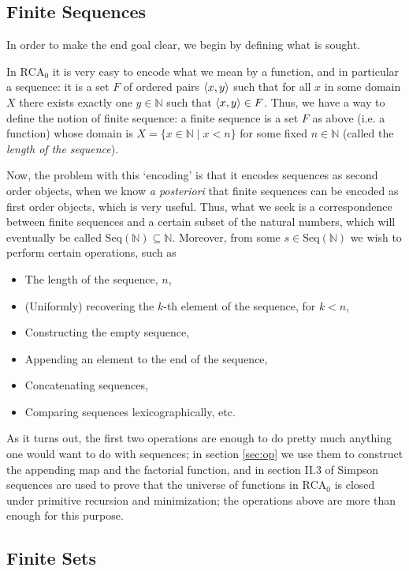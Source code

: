 \documentclass{article}
\theoremstyle{nonumberplain}
\newcommand{\N}{\mathbb{N}}
\newcommand{\RCA}{\mathrm{RCA}}
\newcommand{\Seq}{\mathrm{Seq}}
\DeclarePairedDelimiter{\braket}{\langle}{\rangle}
\begin{document}
\subsection{Finite Sequences}\label{subsec:fs}

In order to make the end goal clear, we begin by defining what is sought.

In $\RCA_0$ it is very easy to encode what we mean by a function, and in particular a sequence: it is a set $F$ of ordered pairs $\braket{x,y}$ such that for all $x$ in some domain $X$ there exists exactly one $y \in \N$ such that $\braket{x,y} \in F$. Thus, we have a way to define the notion of finite sequence: a finite sequence is a set $F$ as above (i.e. a function) whose domain is $X = \{x \in \N \mid x < n\}$ for some fixed $n \in \N$ (called the \emph{length of the sequence}).

Now, the problem with this `encoding' is that it encodes sequences as second order objects, when we know \textit{a posteriori} that finite sequences can be encoded as first order objects, which is very useful. Thus, what we seek is a correspondence between finite sequences and a certain subset of the natural numbers, which will eventually be called $\Seq(\N) \subseteq \N$. Moreover, from some $s \in \Seq(\N)$ we wish to perform certain operations, such as
\begin{itemize}
\item The length of the sequence, $n$,
\item (Uniformly) recovering the $k$-th element of the sequence, for $k < n$,
\item Constructing the empty sequence,
\item Appending an element to the end of the sequence,
\item Concatenating sequences,
\item Comparing sequences lexicographically, etc.
\end{itemize}

As it turns out, the first two operations are enough to do pretty much anything one would want to do with sequences; in section \ref{sec:op} we use them to construct the appending map and the factorial function, and in section II.3 of Simpson \cite{simpson} sequences are used to prove that the universe of functions in $\RCA_0$ is closed under primitive recursion and minimization; the operations above are more than enough for this purpose.

\subsection{Finite Sets}
\end{document}

